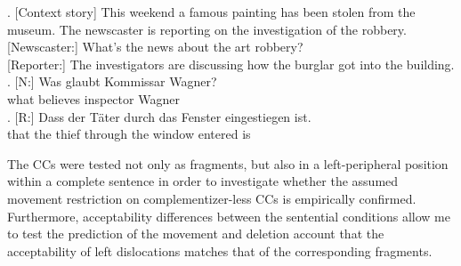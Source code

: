 \ex. [Context story] This weekend a famous painting has been stolen from the museum. The newscaster is reporting on the investigation of the robbery.\\ \mbox{}[Newscaster:] What's the news about the art robbery?\\ \mbox{}[Reporter:] The investigators are discussing how the burglar got into the building.\label{ex:ccs-experiment-sample-item}
\ag. [N:] Was glaubt Kommissar Wagner?\\
\mbox{} what believes inspector Wagner\\
\bg. [R:] Dass der Täter durch  das Fenster  eingestiegen ist.\\
     \mbox{} that  the thief through the window  entered is\\

The CCs were tested not only as fragments, but also in a left-peripheral position within a complete sentence in order to investigate whether the assumed movement restriction on complementizer-less CCs is empirically confirmed. Furthermore, acceptability differences between the sentential conditions allow me to test the prediction of the movement and deletion account that the acceptability of left dislocations matches that of the corresponding fragments.

